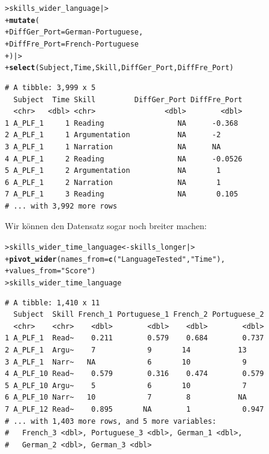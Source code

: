 \documentclass[oneside, 10pt]{book}\usepackage[]{graphicx}\usepackage[]{xcolor}
\makeatletter
\newcommand{\hlstr}[1]{\textcolor[rgb]{0.192,0.494,0.8}{#1}}%
\newcommand{\hlopt}[1]{\textcolor[rgb]{0,0,0}{#1}}%
\newcommand{\hlstd}[1]{\textcolor[rgb]{0.345,0.345,0.345}{#1}}%
\newcommand{\hlkwb}[1]{\textcolor[rgb]{0.69,0.353,0.396}{#1}}%
\newcommand{\hlkwc}[1]{\textcolor[rgb]{0.333,0.667,0.333}{#1}}%
\newcommand{\hlkwd}[1]{\textcolor[rgb]{0.737,0.353,0.396}{\textbf{#1}}}%
\newenvironment{kframe}{%
 \def\at@end@of@kframe{}%
 \ifinner\ifhmode%
  \def\at@end@of@kframe{\end{minipage}}%
  \begin{minipage}{\columnwidth}%
 \fi\fi%
 \def\FrameCommand##1{\hskip\@totalleftmargin \hskip-\fboxsep
 \colorbox{shadecolor}{##1}\hskip-\fboxsep
     \hskip-\linewidth \hskip-\@totalleftmargin \hskip\columnwidth}%
 \MakeFramed {\advance\hsize-\width
   \@totalleftmargin\z@ \linewidth\hsize
   \@setminipage}}%
 {\par\unskip\endMakeFramed%
 \at@end@of@kframe}
\newenvironment{knitrout}{}{} %
\makeatother
\begin{document}
\begin{knitrout}
\color{fgcolor}\begin{kframe}
\begin{alltt}
\hlstd{> }\hlstd{skills_wider_language |>}
\hlstd{+ }  \hlkwd{mutate}\hlstd{(}
\hlstd{+ }    \hlkwc{DiffGer_Port} \hlstd{= German} \hlopt{-} \hlstd{Portuguese,}
\hlstd{+ }    \hlkwc{DiffFre_Port} \hlstd{= French} \hlopt{-} \hlstd{Portuguese}
\hlstd{+ }  \hlstd{) |>}
\hlstd{+ }  \hlkwd{select}\hlstd{(Subject, Time, Skill, DiffGer_Port, DiffFre_Port)}
\end{alltt}
\begin{verbatim}
# A tibble: 3,999 x 5
  Subject  Time Skill         DiffGer_Port DiffFre_Port
  <chr>   <dbl> <chr>                <dbl>        <dbl>
1 A_PLF_1     1 Reading                 NA      -0.368 
2 A_PLF_1     1 Argumentation           NA      -2     
3 A_PLF_1     1 Narration               NA      NA     
4 A_PLF_1     2 Reading                 NA      -0.0526
5 A_PLF_1     2 Argumentation           NA       1     
6 A_PLF_1     2 Narration               NA       1     
7 A_PLF_1     3 Reading                 NA       0.105 
# ... with 3,992 more rows
\end{verbatim}
\end{kframe}
\end{knitrout}


Wir können den Datensatz sogar noch breiter machen:
\begin{knitrout}
\color{fgcolor}\begin{kframe}
\begin{alltt}
\hlstd{> }\hlstd{skills_wider_time_language} \hlkwb{<-} \hlstd{skills_longer |>}
\hlstd{+ }  \hlkwd{pivot_wider}\hlstd{(}\hlkwc{names_from} \hlstd{=} \hlkwd{c}\hlstd{(}\hlstr{"LanguageTested"}\hlstd{,} \hlstr{"Time"}\hlstd{),}
\hlstd{+ }              \hlkwc{values_from} \hlstd{=} \hlstr{"Score"}\hlstd{)}
\hlstd{> }\hlstd{skills_wider_time_language}
\end{alltt}
\begin{verbatim}
# A tibble: 1,410 x 11
  Subject  Skill French_1 Portuguese_1 French_2 Portuguese_2
  <chr>    <chr>    <dbl>        <dbl>    <dbl>        <dbl>
1 A_PLF_1  Read~    0.211        0.579    0.684        0.737
2 A_PLF_1  Argu~    7            9       14           13    
3 A_PLF_1  Narr~   NA            6       10            9    
4 A_PLF_10 Read~    0.579        0.316    0.474        0.579
5 A_PLF_10 Argu~    5            6       10            7    
6 A_PLF_10 Narr~   10            7        8           NA    
7 A_PLF_12 Read~    0.895       NA        1            0.947
# ... with 1,403 more rows, and 5 more variables:
#   French_3 <dbl>, Portuguese_3 <dbl>, German_1 <dbl>,
#   German_2 <dbl>, German_3 <dbl>
\end{verbatim}
\end{kframe}
\end{knitrout}
\end{document}
